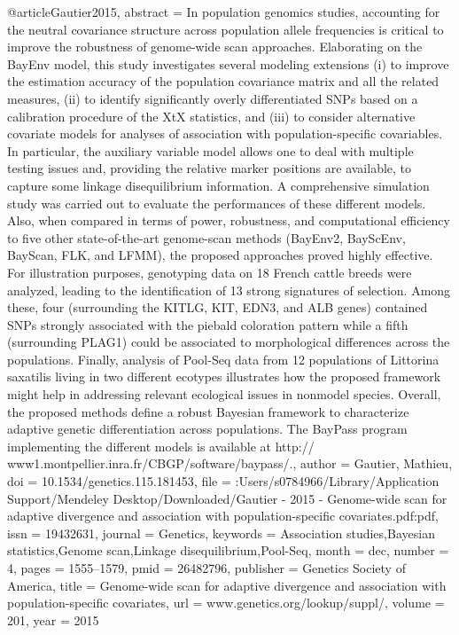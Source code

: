 @article{Gautier2015,
abstract = {In population genomics studies, accounting for the neutral covariance structure across population allele frequencies is critical to improve the robustness of genome-wide scan approaches. Elaborating on the BayEnv model, this study investigates several modeling extensions (i) to improve the estimation accuracy of the population covariance matrix and all the related measures, (ii) to identify significantly overly differentiated SNPs based on a calibration procedure of the XtX statistics, and (iii) to consider alternative covariate models for analyses of association with population-specific covariables. In particular, the auxiliary variable model allows one to deal with multiple testing issues and, providing the relative marker positions are available, to capture some linkage disequilibrium information. A comprehensive simulation study was carried out to evaluate the performances of these different models. Also, when compared in terms of power, robustness, and computational efficiency to five other state-of-the-art genome-scan methods (BayEnv2, BayScEnv, BayScan, FLK, and LFMM), the proposed approaches proved highly effective. For illustration purposes, genotyping data on 18 French cattle breeds were analyzed, leading to the identification of 13 strong signatures of selection. Among these, four (surrounding the KITLG, KIT, EDN3, and ALB genes) contained SNPs strongly associated with the piebald coloration pattern while a fifth (surrounding PLAG1) could be associated to morphological differences across the populations. Finally, analysis of Pool-Seq data from 12 populations of Littorina saxatilis living in two different ecotypes illustrates how the proposed framework might help in addressing relevant ecological issues in nonmodel species. Overall, the proposed methods define a robust Bayesian framework to characterize adaptive genetic differentiation across populations. The BayPass program implementing the different models is available at http:// www1.montpellier.inra.fr/CBGP/software/baypass/.},
author = {Gautier, Mathieu},
doi = {10.1534/genetics.115.181453},
file = {:Users/s0784966/Library/Application Support/Mendeley Desktop/Downloaded/Gautier - 2015 - Genome-wide scan for adaptive divergence and association with population-specific covariates.pdf:pdf},
issn = {19432631},
journal = {Genetics},
keywords = {Association studies,Bayesian statistics,Genome scan,Linkage disequilibrium,Pool-Seq},
month = {dec},
number = {4},
pages = {1555--1579},
pmid = {26482796},
publisher = {Genetics Society of America},
title = {{Genome-wide scan for adaptive divergence and association with population-specific covariates}},
url = {www.genetics.org/lookup/suppl/},
volume = {201},
year = {2015}
}
